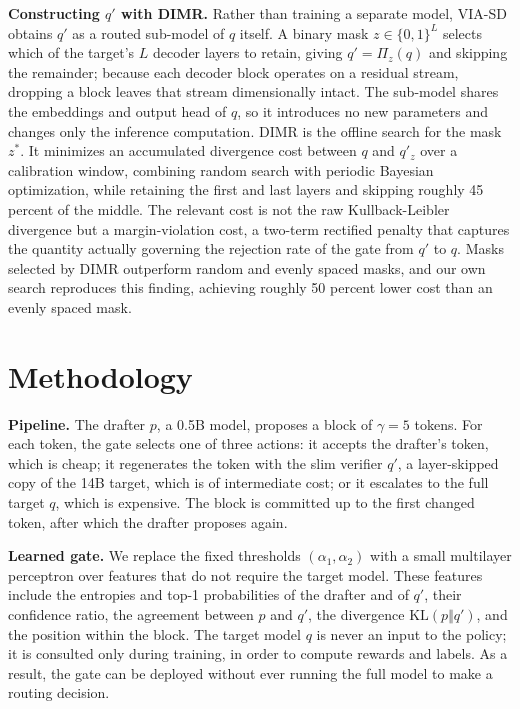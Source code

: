 \documentclass[11pt]{article}
\begin{document}
\textbf{Constructing $q'$ with DIMR.} Rather than training a separate model, VIA-SD obtains $q'$ as a
routed sub-model of $q$ itself. A binary mask $z\in\{0,1\}^L$ selects which of the target's $L$ decoder
layers to retain, giving $q'=\Pi_z(q)$ and skipping the remainder; because each decoder block operates
on a residual stream, dropping a block leaves that stream dimensionally intact. The sub-model shares
the embeddings and output head of $q$, so it introduces no new parameters and changes only the
inference computation. DIMR is the offline search for the mask $z^*$. It minimizes an accumulated
divergence cost between $q$ and $q'_z$ over a calibration window, combining random search with periodic
Bayesian optimization, while retaining the first and last layers and skipping roughly 45 percent of the middle.
The relevant cost is not the raw Kullback-Leibler divergence but a margin-violation cost, a two-term
rectified penalty that captures the quantity actually governing the rejection rate of the gate from
$q'$ to $q$. Masks selected by DIMR outperform random and evenly spaced masks, and our own search
reproduces this finding, achieving roughly 50 percent lower cost than an evenly spaced mask.

\section{Methodology}
\textbf{Pipeline.} The drafter $p$, a 0.5B model, proposes a block of $\gamma=5$ tokens. For each
token, the gate selects one of three actions: it accepts the drafter's token, which is cheap; it
regenerates the token with the slim verifier $q'$, a layer-skipped copy of the 14B target, which is of
intermediate cost; or it escalates to the full target $q$, which is expensive. The block is committed
up to the first changed token, after which the drafter proposes again.

\textbf{Learned gate.} We replace the fixed thresholds $(\alpha_1,\alpha_2)$ with a small multilayer
perceptron over features that do not require the target model. These features include the entropies and
top-1 probabilities of the drafter and of $q'$, their confidence ratio, the agreement between $p$ and
$q'$, the divergence $\mathrm{KL}(p\Vert q')$, and the position within the block. The target model $q$
is never an input to the policy; it is consulted only during training, in order to compute rewards and
labels. As a result, the gate can be deployed without ever running the full model to make a routing
decision.
\end{document}
